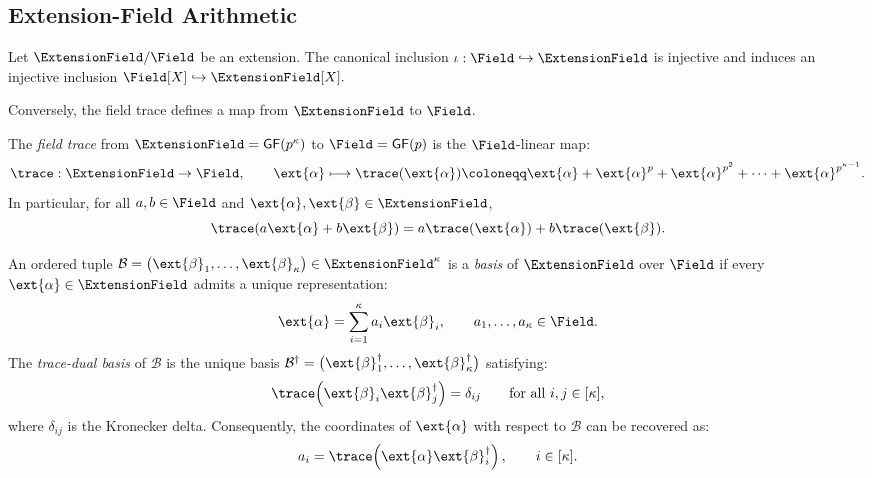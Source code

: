 \subsection{Extension-Field Arithmetic}

\begin{fact}
\label{fact:injective}
Let\/ \(\ExtensionField/\Field\) be an extension.
The canonical inclusion
\(
    \iota:\Field\hookrightarrow\ExtensionField
\)
is injective and induces an injective inclusion
\(
    \Field[X]\hookrightarrow\ExtensionField[X].
\)
\end{fact}

Conversely, the field trace defines a map from \(\ExtensionField\) to \(\Field\).
\begin{definition}
\label{def:trace}
The \emph{field trace} from \(\ExtensionField = \mathsf{GF}(p^\kappa)\) to \(\Field = \mathsf{GF}(p)\)
is the \(\Field\)-linear map:
\[
    \trace:\ExtensionField\to\Field,
    \qquad
    \ext{\alpha}
    \longmapsto
    \trace(\ext{\alpha})
    \coloneqq \ext{\alpha} + \ext{\alpha}^p + \ext{\alpha}^{p^2} + \cdots + \ext{\alpha}^{p^{\kappa-1}}.
\]
In particular, for all \(a,b\in\Field\) and
\(\ext{\alpha},\ext{\beta}\in\ExtensionField\),
\[
    \trace\!\left(
        a\ext{\alpha}+b\ext{\beta}
    \right)
    =
    a\trace(\ext{\alpha})
    +
    b\trace(\ext{\beta}).
\]
\end{definition}

\begin{definition}
\label{def:basis}
An ordered tuple
\(
    \mathcal B
    =
    \bigl(
        \ext{\beta}_1,\ldots,\ext{\beta}_\kappa
    \bigr)
    \in\ExtensionField^\kappa
\)
is a \emph{basis} of \(\ExtensionField\) over \(\Field\) if every
\(\ext{\alpha}\in\ExtensionField\) admits a unique representation:
\[
    \ext{\alpha}
    =
    \sum_{i=1}^{\kappa}a_i\ext{\beta}_i,
    \qquad
    a_1,\ldots,a_\kappa\in\Field.
\]
The \emph{trace-dual basis} of \(\mathcal B\) is the unique basis
\(
    \mathcal B^\dagger
    =
    \bigl(
        \ext{\beta}_1^\dagger,\ldots,
        \ext{\beta}_\kappa^\dagger
    \bigr)
\)
satisfying:
\[
    \trace\!\left(
        \ext{\beta}_i\ext{\beta}_j^\dagger
    \right)
    =
    \delta_{ij}
    \qquad
    \text{for all }i,j\in[\kappa],
\]
where \(\delta_{ij}\) is the Kronecker delta. Consequently, the
coordinates of \(\ext{\alpha}\) with respect to \(\mathcal B\)
can be recovered as:
\[
    a_i
    =
    \trace\!\left(
        \ext{\alpha}\ext{\beta}_i^\dagger
    \right),
    \qquad
    i\in[\kappa].
\]
\end{definition}

